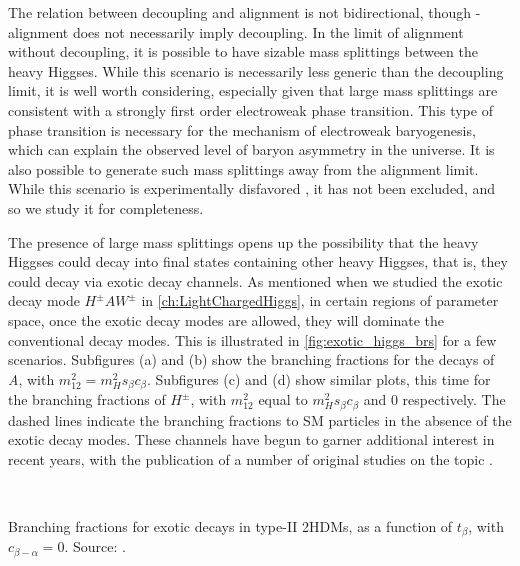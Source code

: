 The relation between decoupling and alignment is not bidirectional, though - alignment does not necessarily imply decoupling. In the limit of alignment without decoupling, it is possible to have sizable mass splittings between the heavy Higgses. While this scenario is necessarily less generic than the decoupling limit, it is well worth considering, especially given that large mass splittings are consistent with a strongly first order electroweak phase transition. This type of phase transition is necessary for the mechanism of electroweak baryogenesis, which can explain the observed level of baryon asymmetry in the universe. It is also possible to generate such mass splittings away from the alignment limit. While this scenario is experimentally disfavored \cite{Aad:2015pla}, it has not been excluded, and so we study it for completeness.

The presence of large mass splittings opens up the possibility that the heavy Higgses could decay into final states containing other heavy Higgses, that is, they could decay via exotic decay channels. As mentioned when we studied the exotic decay mode $H^\pm AW^\pm$ in \autoref{ch:LightChargedHiggs}, in certain regions of parameter space, once the exotic decay modes are allowed, they will dominate the conventional decay modes. This is illustrated in \autoref{fig:exotic_higgs_brs} for a few scenarios. Subfigures (a) and (b) show the branching fractions for the decays of \emph{A}, with $m_{12}^2 = m_H^2 s_\beta c_\beta$. Subfigures (c) and (d) show similar plots, this time for the branching fractions of $H^\pm$, with $m_{12}^2$ equal to $m_H^2 s_\beta c_\beta$ and $0$ respectively. The dashed lines indicate the branching fractions to SM particles in the absence of the exotic decay modes. These channels have begun to garner additional interest in recent years, with the publication of a number of original studies on the topic \cite{Dorsch:2014qja,Dorsch:2016tab,Coleppa2013a,Coleppa2014a,Brownson:2013lka,Coleppa:2014cca,Kling2015c,Li:2015lra,Maitra:2014qea,Basso:2012st,Dermisek:2013cxa,Mohn:2005lda,Assamagan:2000ud}. 

\begin{marginfigure}
  \centering
  \\
  \caption{Branching fractions for exotic decays in type-II 2HDMs, as a function of $t_\beta$, with $c_{\beta-\alpha} = 0$. Source: \cite{Kling2016}.}
\label{fig:exotic_higgs_brs}
\end{marginfigure}

